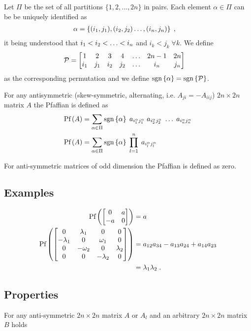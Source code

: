 Let $\Pi$ be the set of all partitions $\{1,2,\ldots,2n\}$ in pairs. 
Each element $\alpha\in \Pi$ can be be uniquely identified as 
%
\begin{align*}
\alpha &=\pairset{i}{j}{n}\;,
\end{align*}
%
it being understood that $\compset{i}{<}{n}$ and
$i_{k}<j_{k}\;\forall k$.
We define
%
\begin{align*}
\cP  &= 
\begin{bmatrix}
	1&2&3&4&\ldots& 2n-1&2n\\
	i_{1}&	j_{1} &	i_{2}	& j_{2} &\ldots &	i_{n} & j_{n}
\end{bmatrix}
\end{align*}
%
as the corresponding permutation and we define $\sign{\alpha} = \sign{\cP }$.

For any antisymmetric (skew-symmetric, alternating, i.e. $A_{ji}=-A_{iij}$) $2n\times 2n$ matrix $A$ the Pfaffian is defined as
%
\begin{align}\label{eq:}
\Pf{A} &=\sum_{\alpha\in \Pi} \sign{\alpha}\; \setprod{a}{i^{\alpha}}{j^{\alpha}}{n}\\
\Pf{A} &=\sum_{\alpha\in \Pi} \sign{\alpha}\; \Setprod{a}{i^{\alpha}}{j^{\alpha}}{n}
\end{align}
%

For anti-symmetric matrices of odd dimension the Pfaffian is defined as zero.


\subsection{Examples}

%
\begin{align*}
\Pf{
\begin{bmatrix}
	0&a\\-a&0
\end{bmatrix}
} &= a\\
\Pf{
\begin{bmatrix}
	0&\lambda_{1}&0&0\\
	-\lambda_{1}&0&\omega_{1}&0\\
	0&-\omega_{2}&0&\lambda_{2}\\
	0&0&-\lambda_{2}&0
\end{bmatrix}
} &= a_{12}a_{34} - a_{13}a_{24} + a_{14}a_{23}\\
&=\lambda_{1}\lambda_{2}\;.
\end{align*}
%

\subsection{Properties}
For any anti-symmetric $2n\times 2n$ matrix $A$ or $A_{l}$ and an arbitrary $2n\times 2n$ matrix $B$
holds 
%

